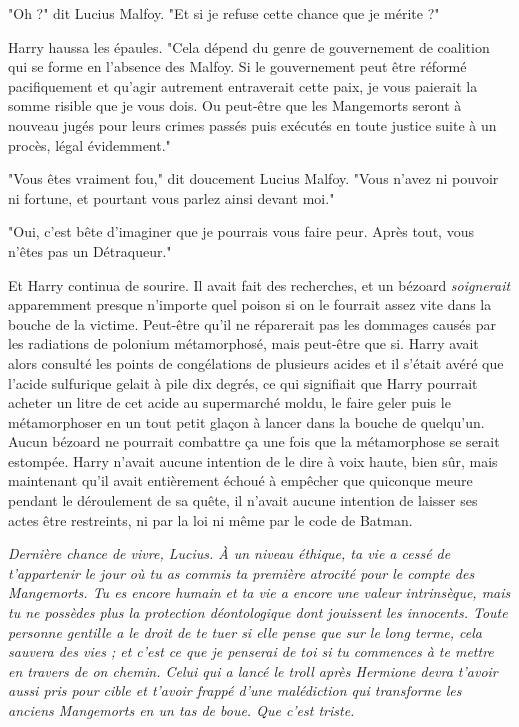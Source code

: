 "Oh ?" dit Lucius Malfoy. "Et si je refuse cette chance que je mérite ?"

Harry haussa les épaules. "Cela dépend du genre de gouvernement de coalition qui se forme en l'absence des Malfoy. Si le gouvernement peut être réformé pacifiquement et qu'agir autrement entraverait cette paix, je vous paierait la somme risible que je vous dois. Ou peut-être que les Mangemorts seront à nouveau jugés pour leurs crimes passés puis exécutés en toute justice suite à un procès, légal évidemment."

"Vous êtes vraiment fou," dit doucement Lucius Malfoy. "Vous n'avez ni pouvoir ni fortune, et pourtant vous parlez ainsi devant moi."

"Oui, c'est bête d'imaginer que je pourrais vous faire peur. Après tout, vous n'êtes pas un Détraqueur."

Et Harry continua de sourire. Il avait fait des recherches, et un bézoard \emph{soignerait}  apparemment presque n'importe quel poison si on le fourrait assez vite dans la bouche de la victime. Peut-être qu'il ne réparerait pas les dommages causés par les radiations de polonium métamorphosé, mais peut-être que si. Harry avait alors consulté les points de congélations de plusieurs acides et il s'était avéré que l'acide sulfurique gelait à pile dix degrés, ce qui signifiait que Harry pourrait acheter un litre de cet acide au supermarché moldu, le faire geler puis le métamorphoser en un tout petit glaçon à lancer dans la bouche de quelqu'un. Aucun bézoard ne pourrait combattre ça une fois que la métamorphose se serait estompée. Harry n'avait aucune intention de le dire à voix haute, bien sûr, mais maintenant qu'il avait entièrement échoué à empêcher que quiconque meure pendant le déroulement de sa quête, il n'avait aucune intention de laisser ses actes être restreints, ni par la loi ni même par le code de Batman.

\emph{Dernière chance de vivre, Lucius. À un niveau éthique, ta vie a cessé de t'appartenir le jour où tu as commis ta première atrocité pour le compte des Mangemorts. Tu es encore humain et ta vie a encore une valeur intrinsèque, mais tu ne possèdes plus la protection déontologique dont jouissent les innocents. Toute personne gentille a le droit de te tuer si elle pense que sur le long terme, cela sauvera des vies ; et c'est ce que je penserai de toi si tu commences à te mettre en travers de on chemin. Celui qui a lancé le troll après Hermione devra t'avoir aussi pris pour cible et t'avoir frappé d'une malédiction qui transforme les anciens Mangemorts en un tas de boue. Que c'est triste.} 


